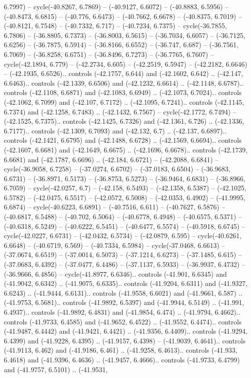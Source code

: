 \begin{scope}[shift={(2.5552, 9.9912)}]
\begin{scope}[shift={(48.1654, -14.8546)}]
6.7997) -- cycle(-40.8267, 6.7869) -- (-40.9127, 6.6072) -- (-40.8883, 6.5956) -- (-40.8473, 6.6815) -- (-40.776, 6.6473) -- (-40.7662, 6.6678) -- (-40.8375, 6.7019) -- (-40.8121, 6.7548) -- (-40.7332, 6.717) -- (-40.7234, 6.7375) -- cycle(-36.7855, 6.7806) -- (-36.8805, 6.7373) -- (-36.8003, 6.5615) -- (-36.7034, 6.6057) -- (-36.7125, 6.6256) -- (-36.7875, 6.5914) -- (-36.8166, 6.6552) -- (-36.747, 6.687) -- (-36.7561, 6.7069) -- (-36.8258, 6.6751) -- (-36.8496, 6.7273) -- (-36.7765, 6.7607) -- cycle(-42.1894, 6.779) -- (-42.2734, 6.605) -- (-42.2519, 6.5947) -- (-42.2182, 6.6646) -- (-42.1935, 6.6526).. controls (-42.1757, 6.644) and (-42.1602, 6.642) .. (-42.147, 6.6463).. controls (-42.1339, 6.6506) and (-42.1232, 6.6614) .. (-42.1148, 6.6787).. controls (-42.1108, 6.6871) and (-42.1083, 6.6949) .. (-42.1073, 6.7024).. controls (-42.1062, 6.7099) and (-42.107, 6.7172) .. (-42.1095, 6.7241).. controls (-42.1145, 6.7374) and (-42.1258, 6.7483) .. (-42.1432, 6.7567) -- cycle(-42.1772, 6.7494) -- (-42.1525, 6.7375).. controls (-42.1425, 6.7326) and (-42.1361, 6.726) .. (-42.1336, 6.7177).. controls (-42.1309, 6.7093) and (-42.132, 6.7) .. (-42.137, 6.6897).. controls (-42.1421, 6.6795) and (-42.1488, 6.6728) .. (-42.1569, 6.6694).. controls (-42.1607, 6.6681) and (-42.1649, 6.6675) .. (-42.1696, 6.6678).. controls (-42.1739, 6.6681) and (-42.1787, 6.6696) .. (-42.184, 6.6721) -- (-42.2088, 6.6841) -- cycle(-36.9058, 6.7258) -- (-37.0274, 6.6702) -- (-37.0183, 6.6504) -- (-36.9683, 6.6731) -- (-36.8971, 6.5173) -- (-36.8753, 6.5273) -- (-36.9464, 6.6831) -- (-36.8966, 6.7059) -- cycle(-42.0257, 6.7) -- (-42.158, 6.5493) -- (-42.1358, 6.5387) -- (-42.1025, 6.5782) -- (-42.0475, 6.5517) -- (-42.0572, 6.5008) -- (-42.0353, 6.4902) -- (-41.9995, 6.6874) -- cycle(-40.6223, 6.6891) -- (-40.7516, 6.611) -- (-40.7627, 6.5876) -- (-40.6817, 6.5488) -- (-40.702, 6.5064) -- (-40.6778, 6.4948) -- (-40.6575, 6.5371) -- (-40.6318, 6.5249) -- (-40.6222, 6.5451) -- (-40.6477, 6.5574) -- (-40.5918, 6.6745) -- cycle(-42.0227, 6.6731) -- (-42.0432, 6.5734) -- (-42.0879, 6.595) -- cycle(-40.6261, 6.6648) -- (-40.6719, 6.569) -- (-40.7334, 6.5984) -- cycle(-37.0468, 6.6613) -- (-37.0674, 6.6519) -- (-37.0014, 6.5073) -- (-37.1214, 6.6273) -- (-37.1485, 6.615) -- (-37.0683, 6.4392) -- (-37.0477, 6.4486) -- (-37.1137, 6.5933) -- (-36.9937, 6.4732) -- (-36.9666, 6.4856) -- cycle(-41.8977, 6.6346).. controls (-41.901, 6.6345) and (-41.9042, 6.6342) .. (-41.9075, 6.6335).. controls (-41.9204, 6.6311) and (-41.9327, 6.6243) .. (-41.9444, 6.6131).. controls (-41.9558, 6.6021) and (-41.9661, 6.587) .. (-41.9753, 6.5681).. controls (-41.9892, 6.5397) and (-41.9944, 6.5149) .. (-41.991, 6.4937).. controls (-41.9892, 6.4831) and (-41.9854, 6.474) .. (-41.9794, 6.4662).. controls (-41.9733, 6.4585) and (-41.9652, 6.4522) .. (-41.9552, 6.4474).. controls (-41.9487, 6.4442) and (-41.9421, 6.4421) .. (-41.9356, 6.4409).. controls (-41.9294, 6.4399) and (-41.9228, 6.4395) .. (-41.9157, 6.4398) -- (-41.9039, 6.4641).. controls (-41.9113, 6.462) and (-41.9186, 6.461) .. (-41.9258, 6.4613).. controls (-41.933, 6.4618) and (-41.9396, 6.4636) .. (-41.9457, 6.4666).. controls (-41.9733, 6.4799) and (-41.9757, 6.5101) .. (-41.9531, 
\end{scope}
\end{scope}
